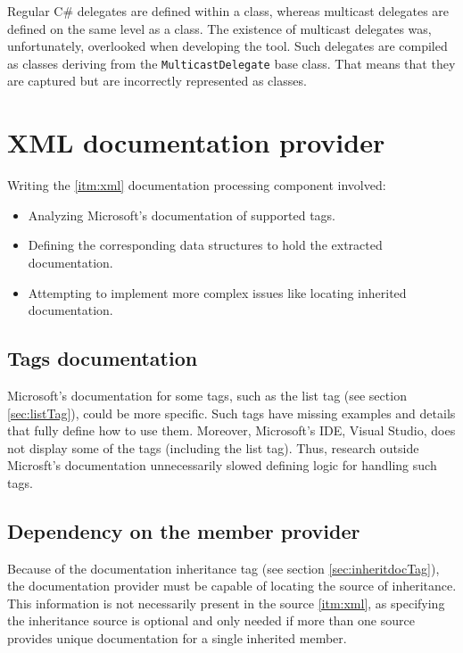 Regular C\# delegates are defined within a class, whereas multicast delegates are defined on the same level as a class.
The existence of multicast delegates was, unfortunately, overlooked when developing the tool.
Such delegates are compiled as classes deriving from the \lstinline[language=csh]{MulticastDelegate} base class.
That means that they are captured but are incorrectly represented as classes.

\section{XML documentation provider}

Writing the \ref{itm:xml} documentation processing component involved:
\begin{itemize}
    \item Analyzing Microsoft's documentation of supported tags.
    \item Defining the corresponding data structures to hold the extracted documentation.
    \item Attempting to implement more complex issues like locating inherited documentation.
\end{itemize}

\subsection{Tags documentation}

Microsoft's documentation for some tags, such as the list tag (see section \ref{sec:listTag}), could be more specific. Such tags have missing examples and details that fully define how to use them. Moreover, Microsoft's IDE, Visual Studio, does not display some of the tags (including the list tag). Thus, research outside Microsft's documentation unnecessarily slowed defining logic for handling such tags.

\subsection{Dependency on the member provider}

Because of the documentation inheritance tag (see section \ref{sec:inheritdocTag}), the documentation provider must be capable of locating the source of inheritance. This information is not necessarily present in the source \ref{itm:xml}, as specifying the inheritance source is optional and only needed if more than one source provides unique documentation for a single inherited member.

